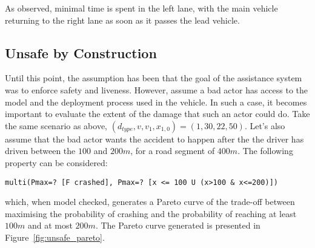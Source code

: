 As observed, minimal time is spent in the left lane, with the main vehicle returning to the right lane as soon as it passes the lead vehicle.

%
%
%

\subsection{Unsafe by Construction}

Until this point, the assumption has been that the goal of the assistance system was to enforce safety and liveness. However, assume a bad actor has access to the model and the deployment process used in the vehicle. In such a case, it becomes important to evaluate the extent of the damage that such an actor could do. Take the same scenario as above, $(d_{type}, v, v_1, x_{1,0}) = (1, 30, 22, 50)$. Let's also assume that the bad actor wants the accident to happen after the the driver has driven between the $100$ and $200m$, for a road segment of $400m$. The following property can be considered:

\begin{minipage}{\linewidth}
{\vspace{1em}
\begin{lstlisting}
multi(Pmax=? [F crashed], Pmax=? [x <= 100 U (x>100 & x<=200)])
\end{lstlisting}
}
\end{minipage}

which, when model checked, generates a Pareto curve of the trade-off between maximising the probability of crashing and the probability of reaching at least $100m$ and at most $200m$. The Pareto curve generated is presented in Figure~\ref{fig:unsafe_pareto}.

